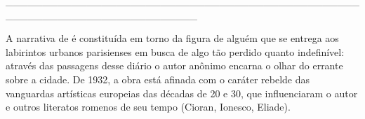 \hspace*{-2cm}\_\_\_\_\_\_\_\_\_\_\_\_\_\_\_\_\_\_\_\_\_\_\_\_\_\_\_\_\_\_\_\_\_\_\_\_\_\_\_\_\_\_\_\_\_\_\_\_\_\_\_\_\_\_\_\_\_\_\_\_\_\_\_\_\_\_\_\_\_\_\_\_\_\_

\medskip

\noindent{}A narrativa de {} é constituída em torno da figura de alguém que se entrega aos labirintos urbanos parisienses em busca de algo tão perdido quanto indefinível: através das passagens desse diário o autor anônimo encarna o olhar do errante sobre a cidade. De 1932, a obra está afinada com o caráter rebelde das vanguardas artísticas europeias das décadas de 20 e 30, que influenciaram o autor e outros literatos romenos de seu tempo (Cioran, Ionesco, Eliade).

\vfill

\hspace*{-.4cm}\begin{minipage}[c]{0.80\linewidth}
\small{
{}}
\end{minipage}

\pagebreak
